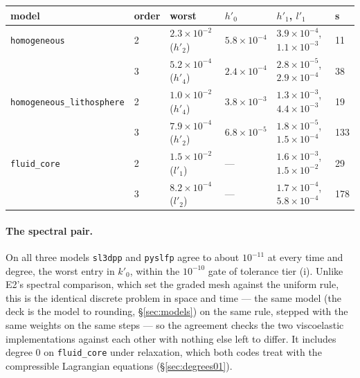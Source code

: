 \documentclass[11pt]{article}
\numberwithin{equation}{section}
\newcommand{\code}[1]{\texttt{#1}}
\begin{document}
\begin{center}
\small
\begin{tabular}{@{}llllll@{}}
\toprule
model & order & worst & $h'_0$ & $h'_1$, $l'_1$ & s \\
\midrule
\code{homogeneous} & 2 & $2.3\times10^{-2}$ ($h'_2$) & $5.8\times10^{-4}$ &
$3.9\times10^{-4}$, $1.1\times10^{-3}$ & 11 \\
& 3 & $5.2\times10^{-4}$ ($h'_4$) & $2.4\times10^{-4}$ &
$2.8\times10^{-5}$, $2.9\times10^{-4}$ & 38 \\ \addlinespace
\code{homogeneous\_lithosphere} & 2 & $1.0\times10^{-2}$ ($h'_4$) &
$3.8\times10^{-3}$ & $1.3\times10^{-3}$, $4.4\times10^{-3}$ & 19 \\
& 3 & $7.9\times10^{-4}$ ($h'_2$) & $6.8\times10^{-5}$ &
$1.8\times10^{-5}$, $1.5\times10^{-4}$ & 133 \\ \addlinespace
\code{fluid\_core} & 2 & $1.5\times10^{-2}$ ($l'_1$) & --- &
$1.6\times10^{-3}$, $1.5\times10^{-2}$ & 29 \\
& 3 & $8.2\times10^{-4}$ ($l'_2$) & --- &
$1.7\times10^{-4}$, $5.8\times10^{-4}$ & 178 \\
\bottomrule
\end{tabular}
\end{center}

\paragraph{The spectral pair.} On all three models \code{sl3dpp} and
\code{pyslfp} agree to about $10^{-11}$ at every time and degree, the worst
entry in $k'_0$, within the $10^{-10}$ gate of tolerance tier (i). Unlike E2's spectral comparison,
which set the graded mesh against the uniform rule, this is the identical
discrete problem in space and time --- the same model (the deck is the
model to rounding, \S\ref{sec:models}) on the same rule, stepped with the
same weights on the same steps --- so the agreement checks the two
viscoelastic implementations against each other with nothing else left to
differ. It includes degree 0 on \code{fluid\_core} under relaxation, which
both codes treat with the compressible Lagrangian equations
(\S\ref{sec:degrees01}).
\end{document}
